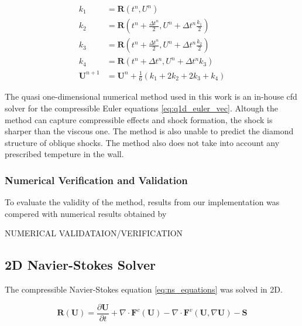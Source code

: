 \begin{align}
    k_1 &= \mathbf{R}(t^n, U^n)  \\
    k_2 &= \mathbf{R}(t^n + \frac{\Delta t^n}{2}, U^n +  \Delta t^n \frac{k_1}{2}) \\
    k_3 &= \mathbf{R}(t^n + \frac{\Delta t^n}{2}, U^n +  \Delta t^n \frac{k_2}{2}) \\
    k_4 &= \mathbf{R}(t^n + \Delta t^n, U^n + \Delta t^n k_3) \\
    \mathbf{U}^{n+1} &= \mathbf{U}^n + \frac{1}{6}(k_1 + 2k_2 + 2k_3 + k_4)
\end{align}

The quasi one-dimensional numerical method used in this work is an in-house cfd solver for the compressible Euler equations \eqref{eq:q1d_euler_vec}. Altough the method can capture compressible effects and shock formation, the shock is sharper than the viscous one. The method is also unable to predict the diamond structure of oblique shocks. The method also does not take into account any prescribed tempeture in the wall. 

\subsubsection{Numerical Verification and Validation}

To evaluate the validity of the method, results from our implementation was compered with numerical results obtained by

NUMERICAL VALIDATAION/VERIFICATION

\subsection{2D Navier-Stokes Solver}
\label{sec:2d_navier_stokes_solver}

The compressible Navier-Stokes equation \eqref{eq:ns_equations} was solved in 2D.

\begin{equation}
    \mathbf{R(\mathbf{U})} = \frac{\partial \mathbf{U}}{\partial t} + \nabla \cdot \mathbf{F}^c(\mathbf{U}) - \nabla \cdot \mathbf{F}^v(\mathbf{U}, \nabla \mathbf{U}) - \mathbf{S}
    \label{eq:navier-stokes}
\end{equation}


